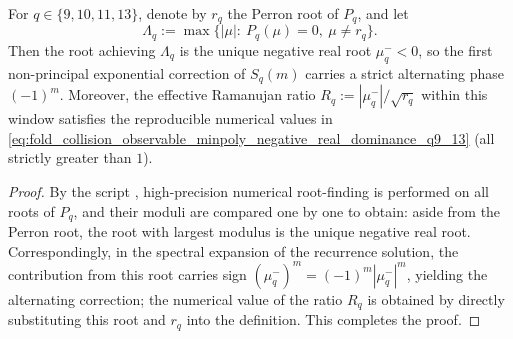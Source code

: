 \begin{proposition}[Negative Real Dominance Law and Alternating Correction: Effective Ramanujan Ratio for \texorpdfstring{$q=9,10,11,13$}{q=9,10,11,13}]\label{prop:pom-observable-minpoly-negative-real-dominance-q9-13}
For \(q\in\{9,10,11,13\}\), denote by \(r_q\) the Perron root of \(P_q\), and let
\[
\Lambda_q:=\max\{|\mu|:\ P_q(\mu)=0,\ \mu\neq r_q\}.
\]
Then the root achieving \(\Lambda_q\) is the unique negative real root \(\mu^-_q<0\), so the first non-principal exponential correction of \(S_q(m)\) carries a strict alternating phase \(({-1})^m\).
Moreover, the effective Ramanujan ratio
\(
R_q:=|\mu^-_q|/\sqrt{r_q}
\)
within this window satisfies the reproducible numerical values in \eqref{eq:fold_collision_observable_minpoly_negative_real_dominance_q9_13} (all strictly greater than \(1\)).
\end{proposition}
\begin{proof}
By the script , high-precision numerical root-finding is performed on all roots of \(P_q\), and their moduli are compared one by one to obtain: aside from the Perron root, the root with largest modulus is the unique negative real root.
Correspondingly, in the spectral expansion of the recurrence solution, the contribution from this root carries sign \((\mu^-_q)^m=(-1)^m|\mu^-_q|^m\), yielding the alternating correction; the numerical value of the ratio \(R_q\) is obtained by directly substituting this root and \(r_q\) into the definition. This completes the proof.
\end{proof}


